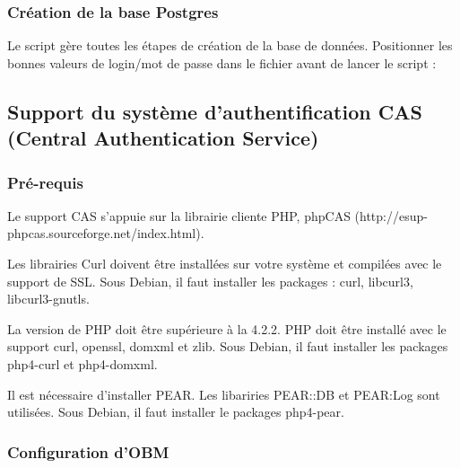 
\subsubsection*{Création de la base Postgres}

Le script  gère toutes les 
étapes de création de la base de données. Positionner les bonnes
valeurs de login/mot de passe dans le fichier  
avant de lancer le script :


\subsection{Support du système d'authentification CAS (Central Authentication Service)}

\subsubsection{Pré-requis}

Le support CAS s'appuie sur la librairie cliente PHP, phpCAS (http://esup-phpcas.sourceforge.net/index.html).

Les librairies Curl doivent être installées sur votre système et compilées avec le support de SSL.
Sous Debian, il faut installer les packages : curl, libcurl3, libcurl3-gnutls.  

La version de PHP doit être supérieure à la 4.2.2.
PHP doit être installé avec le support curl, openssl, domxml et zlib.
Sous Debian, il faut installer les packages php4-curl et php4-domxml.

Il est nécessaire d'installer PEAR. Les libariries PEAR::DB et PEAR:Log sont utilisées.
Sous Debian, il faut installer le packages php4-pear.

\subsubsection{Configuration d'OBM}

